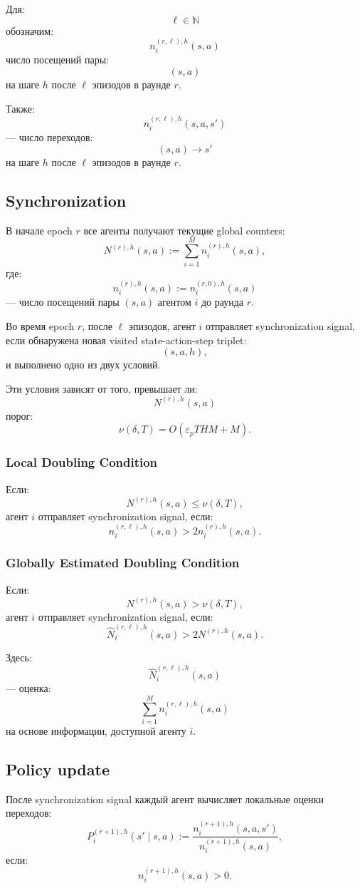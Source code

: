 \documentclass[12pt,a4paper]{article}
\begin{document}
Для:
\[
\ell\in\mathbb N
\]
обозначим:
\[
n_i^{(r,\ell),h}(s,a)
\]
число посещений пары:
\[
(s,a)
\]
на шаге $h$ после $\ell$ эпизодов в раунде $r$.

Также:
\[
n_i^{(r,\ell),h}(s,a,s')
\]
--- число переходов:
\[
(s,a)\to s'
\]
на шаге $h$ после $\ell$ эпизодов в раунде $r$.

\subsection{Synchronization}

В начале epoch $r$ все агенты получают текущие global counters:
\[
N^{(r),h}(s,a)
:=
\sum_{i=1}^{M}
n_i^{(r),h}(s,a),
\]
где:
\[
n_i^{(r),h}(s,a)
:=
n_i^{(r,0),h}(s,a)
\]
--- число посещений пары $(s,a)$ агентом $i$ до раунда $r$.

Во время epoch $r$, после $\ell$ эпизодов, агент $i$ отправляет synchronization signal, если обнаружена новая visited state-action-step triplet:
\[
(s,a,h),
\]
и выполнено одно из двух условий.

Эти условия зависят от того, превышает ли:
\[
N^{(r),h}(s,a)
\]
порог:
\[
\nu(\delta,T)
=
O(\varepsilon_pTHM+M).
\]

\subsubsection{Local Doubling Condition}

Если:
\[
N^{(r),h}(s,a)
\le
\nu(\delta,T),
\]
агент $i$ отправляет synchronization signal, если:
\[
n_i^{(r,\ell),h}(s,a)
>
2n_i^{(r),h}(s,a).
\]

\subsubsection{Globally Estimated Doubling Condition}

Если:
\[
N^{(r),h}(s,a)
>
\nu(\delta,T),
\]
агент $i$ отправляет synchronization signal, если:
\[
\widehat N_i^{(r,\ell),h}(s,a)
>
2N^{(r),h}(s,a).
\]

Здесь:
\[
\widehat N_i^{(r,\ell),h}(s,a)
\]
--- оценка:
\[
\sum_{i=1}^{M}
n_i^{(r,\ell),h}(s,a)
\]
на основе информации, доступной агенту $i$.

\subsection{Policy update}

После synchronization signal каждый агент вычисляет локальные оценки переходов:
\[
P_i^{(r+1),h}(s'\mid s,a)
:=
\frac{
n_i^{(r+1),h}(s,a,s')
}{
n_i^{(r+1),h}(s,a)
},
\]
если:
\[
n_i^{(r+1),h}(s,a)>0.
\]
\end{document}
